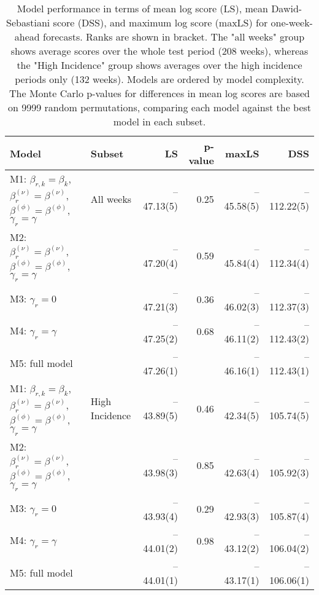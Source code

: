 \begin{table}[ht]
\centering
\begingroup\fontsize{9pt}{10pt}\selectfont
\begin{tabular}{ll|rrrr}
  \hline
Model & Subset & LS & p-value & maxLS & DSS \\ 
  \hline
M1: $\beta_{r,k} = \beta_{k}$, $\beta_{r}^{(\nu)} = \beta^{(\nu)}$, $\beta^{(\phi)} = \beta^{(\phi)}$, $\gamma_r = \gamma$ & All weeks & --47.13(5) & 0.25 & --45.58(5) & --112.22(5) \\ 
  M2: $\beta_{r}^{(\nu)} = \beta^{(\nu)}$, $\beta^{(\phi)} = \beta^{(\phi)}$, $\gamma_r = \gamma$ &  & --47.20(4) & 0.59 & --45.84(4) & --112.34(4) \\ 
  M3: $\gamma_r = 0$ &  & --47.21(3) & 0.36 & --46.02(3) & --112.37(3) \\ 
  M4: $\gamma_r = \gamma$ &  & --47.25(2) & 0.68 & --46.11(2) & --112.43(2) \\ 
  M5: full model &  & --47.26(1) &  & --46.16(1) & --112.43(1) \\ 
   \hline
M1: $\beta_{r,k} = \beta_{k}$, $\beta_{r}^{(\nu)} = \beta^{(\nu)}$, $\beta^{(\phi)} = \beta^{(\phi)}$, $\gamma_r = \gamma$ & High Incidence & --43.89(5) & 0.46 & --42.34(5) & --105.74(5) \\ 
  M2: $\beta_{r}^{(\nu)} = \beta^{(\nu)}$, $\beta^{(\phi)} = \beta^{(\phi)}$, $\gamma_r = \gamma$ &  & --43.98(3) & 0.85 & --42.63(4) & --105.92(3) \\ 
  M3: $\gamma_r = 0$ &  & --43.93(4) & 0.29 & --42.93(3) & --105.87(4) \\ 
  M4: $\gamma_r = \gamma$ &  & --44.01(2) & 0.98 & --43.12(2) & --106.04(2) \\ 
  M5: full model &  & --44.01(1) &  & --43.17(1) & --106.06(1) \\ 
   \hline
\end{tabular}
\endgroup
\caption{Model performance in terms of mean log score (LS),
             mean Dawid-Sebastiani score (DSS), and maximum log score (maxLS)
             for one-week-ahead forecasts.
             Ranks are shown in bracket.
             The "all weeks" group shows average scores over the
             whole test period (208 weeks),
             whereas the "High Incidence" group shows
             averages over the high incidence periods only (132 weeks).
             Models are ordered by model complexity.
             The Monte Carlo p-values for differences in mean log scores
             are based on 9999 random permutations,
             comparing each model against the best model in each subset.} 
\label{tab:forecast}
\end{table}
